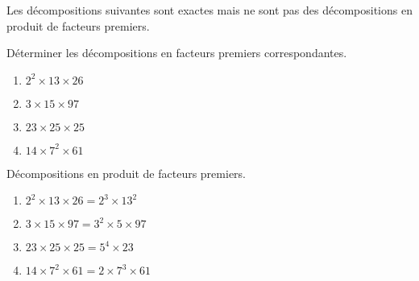 \begin{exercice*}
    Les décompositions suivantes sont exactes mais ne sont pas des décompositions en produit de facteurs
    premiers.

    Déterminer les décompositions en facteurs premiers correspondantes.    
    \begin{enumerate}
        \item $2^2\times 13\times 26$
        \item $3\times 15\times 97$
        \item $23\times 25\times 25$
        \item $14\times 7^2\times 61$
    \end{enumerate}
\end{exercice*}
\begin{corrige}
    Décompositions en produit de facteurs premiers.
    \begin{enumerate}
        \item $2^2\times 13\times 26=2^3\times 13^2$
        \item $3\times 15\times 97=3^2\times 5\times 97$
        \item $23\times 25\times 25=5^4\times 23$
        \item $14\times 7^2\times 61=2\times 7^3\times 61$
    \end{enumerate}
\end{corrige}

